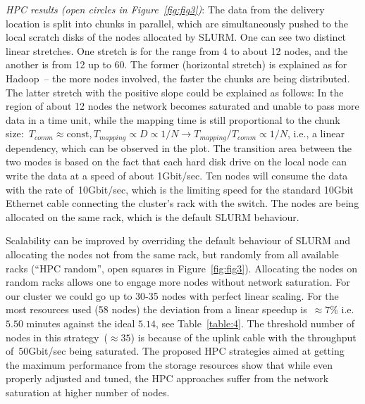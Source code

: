 \documentclass[11pt, oneside]{article}   	%
\newcommand{\COMMENT}[1]{{\color{red} #1 }}
\begin{document}
\textit{HPC results (open circles in Figure~\ref{fig:fig3})}: The data from the delivery location is split into chunks in parallel, which are simultaneously pushed to the local scratch disks of the nodes allocated by SLURM. One can see two distinct linear stretches. One stretch is for the range from 4 to about 12 nodes, and the another is from 12 up to 60. The former (horizontal stretch) is explained as for Hadoop~-- the more nodes involved, the faster the chunks are being distributed. The latter stretch with the positive slope could be explained as follows: In the region of about 12 nodes the network becomes saturated
and unable to pass more data in a time unit, while the mapping time is still proportional to the chunk size:~$T_{comm}\approx\mbox{const}, T_{mapping}\propto D\propto 1/N \rightarrow T_{mapping}/T_{comm}\propto 1/N$, i.e., a linear dependency, which can be observed in the plot. 
The transition area between the two modes is based on the fact that each hard disk drive on the local node can write the data at a speed of about 1Gbit/sec. Ten nodes will consume the data with the rate of~10Gbit/sec, which is the limiting speed for the standard 10Gbit Ethernet cable connecting the cluster's rack with the switch. The nodes are being allocated on the same rack, which is the default SLURM behaviour.

Scalability can be improved by overriding the default behaviour of SLURM and allocating the nodes not from the same rack, but randomly from all available racks (``HPC random'', open squares in Figure~\ref{fig:fig3}). Allocating the nodes on random racks allows one to engage more nodes without network saturation. For our cluster we could go up to 30-35 nodes with perfect linear scaling. For the most resources used (58 nodes) the deviation from a linear speedup is~$\approx 7\%$ i.e. $5.50$ minutes against the ideal $5.14$, see Table~\ref{table:4}. The threshold number of nodes in this strategy~($\approx35$) is because of the uplink cable with the throughput of~50Gbit/sec being saturated. 
The proposed HPC strategies aimed at getting the maximum performance from the storage resources show that while even properly adjusted and tuned, the HPC approaches suffer from the network saturation at higher number of nodes.
\end{document}
